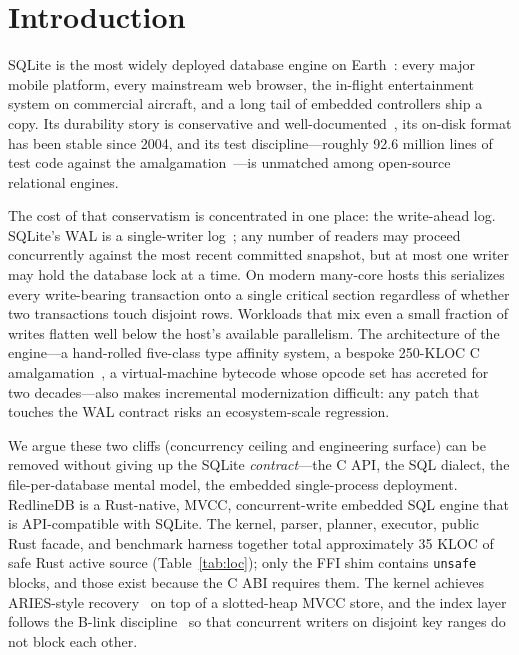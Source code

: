 \section{Introduction}\label{sec:intro}

SQLite is the most widely deployed database engine on
Earth~\cite{sqlite_mostdeployed}: every major mobile platform, every
mainstream web browser, the in-flight entertainment system on commercial
aircraft, and a long tail of embedded controllers ship a copy. Its
durability story is conservative and well-documented~\cite{sqlite_arch},
its on-disk format has been stable since 2004, and its test
discipline---roughly 92.6 million lines of test code against the
amalgamation~\cite{sqlite_testing}---is unmatched among open-source
relational engines.

The cost of that conservatism is concentrated in one place: the
write-ahead log. SQLite's WAL is a single-writer
log~\cite{sqlite_wal}; any number of readers may proceed concurrently
against the most recent committed snapshot, but at most one writer may
hold the database lock at a time. On modern many-core hosts this
serializes every write-bearing transaction onto a single critical
section regardless of whether two transactions touch disjoint rows.
Workloads that mix even a small fraction of writes flatten well below
the host's available parallelism. The architecture of the engine---a
hand-rolled five-class type affinity system, a bespoke 250-KLOC C
amalgamation~\cite{sqlite_footprint}, a virtual-machine bytecode whose
opcode set has accreted for two decades---also makes incremental
modernization difficult: any patch that touches the WAL contract risks
an ecosystem-scale regression.

We argue these two cliffs (concurrency ceiling and engineering surface)
can be removed without giving up the SQLite \emph{contract}---the C
API, the SQL dialect, the file-per-database mental model, the embedded
single-process deployment. RedlineDB is a Rust-native, MVCC,
concurrent-write embedded SQL engine that is API-compatible with
SQLite. The kernel, parser, planner, executor, public Rust facade, and
benchmark harness together total approximately 35 KLOC of safe Rust
active source (Table~\ref{tab:loc}); only the FFI shim contains
\texttt{unsafe} blocks, and those exist because the C ABI requires
them. The kernel achieves ARIES-style recovery~\cite{mohan1992aries} on
top of a slotted-heap MVCC store, and the index layer follows the
B-link discipline~\cite{lehman1981blink,srinivasan1991bplus} so that
concurrent writers on disjoint key ranges do not block each other.


